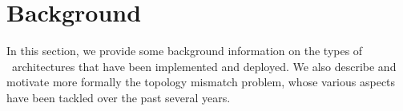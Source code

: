 \section{Background}
\label{section:background}


In this section, we provide some background information on the types of
\p\ architectures that have been implemented and deployed. We also
describe and motivate more formally the topology mismatch problem, 
whose various aspects have been tackled over the past several years.

